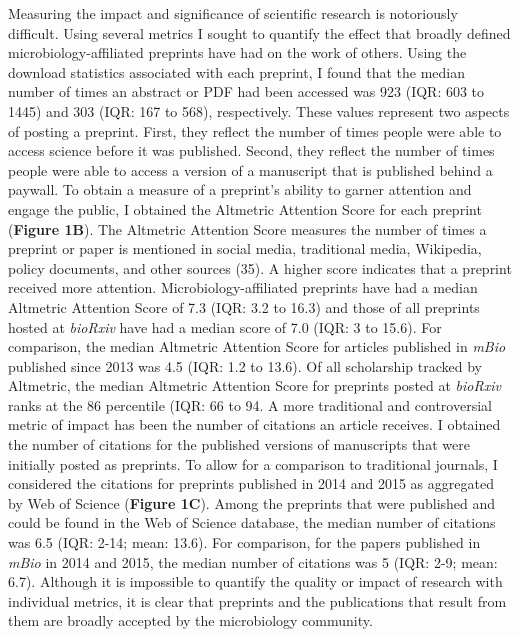 \documentclass[11pt,]{article}
\begin{document}
Measuring the impact and significance of scientific research is
notoriously difficult. Using several metrics I sought to quantify the
effect that broadly defined microbiology-affiliated preprints have had
on the work of others. Using the download statistics associated with
each preprint, I found that the median number of times an abstract or
PDF had been accessed was 923 (IQR: 603 to 1445) and 303 (IQR: 167 to
568), respectively. These values represent two aspects of posting a
preprint. First, they reflect the number of times people were able to
access science before it was published. Second, they reflect the number
of times people were able to access a version of a manuscript that is
published behind a paywall. To obtain a measure of a preprint's ability
to garner attention and engage the public, I obtained the Altmetric
Attention Score for each preprint (\textbf{Figure 1B}). The Altmetric
Attention Score measures the number of times a preprint or paper is
mentioned in social media, traditional media, Wikipedia, policy
documents, and other sources (35). A higher score indicates that a
preprint received more attention. Microbiology-affiliated preprints have
had a median Altmetric Attention Score of 7.3 (IQR: 3.2 to 16.3) and
those of all preprints hosted at \emph{bioRxiv} have had a median score
of 7.0 (IQR: 3 to 15.6). For comparison, the median Altmetric Attention
Score for articles published in \emph{mBio} published since 2013 was 4.5
(IQR: 1.2 to 13.6). Of all scholarship tracked by Altmetric, the median
Altmetric Attention Score for preprints posted at \emph{bioRxiv} ranks
at the 86 percentile (IQR: 66 to 94. A more traditional and
controversial metric of impact has been the number of citations an
article receives. I obtained the number of citations for the published
versions of manuscripts that were initially posted as preprints. To
allow for a comparison to traditional journals, I considered the
citations for preprints published in 2014 and 2015 as aggregated by Web
of Science (\textbf{Figure 1C}). Among the preprints that were published
and could be found in the Web of Science database, the median number of
citations was 6.5 (IQR: 2-14; mean: 13.6). For comparison, for the
papers published in \emph{mBio} in 2014 and 2015, the median number of
citations was 5 (IQR: 2-9; mean: 6.7). Although it is impossible to
quantify the quality or impact of research with individual metrics, it
is clear that preprints and the publications that result from them are
broadly accepted by the microbiology community.
\end{document}

